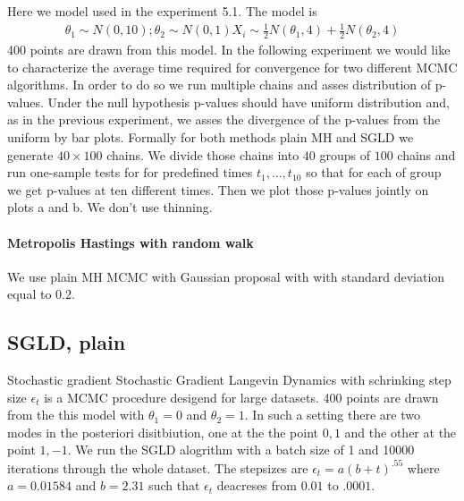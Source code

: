 \documentclass{article}
\begin{document}
Here we model used in the experiment 5.1. The model is 
\begin{align}
 \theta_1 \sim N(0,10) ; \theta_2 \sim N(0,1)
 X_i \sim \frac {1}{2} N(\theta_1,4) + \frac{1}{2} N(\theta_2,4) 
\end{align}
400 points are drawn from this model. In the following experiment we would like to characterize the average time required for convergence for two different MCMC algorithms. In order to do so we run multiple chains and asses distribution of p-values. Under the null hypothesis p-values should have uniform distribution and, as in the previous experiment, we asses the divergence of the p-values from the uniform by bar plots. Formally for both methods plain MH and SGLD we generate $40 \times 100$ chains. We divide those chains into $40$ groups of $100$ chains and run one-sample tests for for predefined times $t_1,...,t_10$  so that for each of group we get p-values at ten different times. Then we plot those p-values jointly on plots a and b. We don't use thinning.  


\paragraph{Metropolis Hastings with random walk}
We use plain MH MCMC with Gaussian proposal with with standard deviation equal to  $0.2$.   

\subsection{SGLD, plain }
Stochastic gradient  Stochastic Gradient Langevin Dynamics  with schrinking step size $\epsilon_t$ is a MCMC procedure desigend for large datasets. 
400 points are drawn from the this model with $\theta_1 = 0$ and $\theta_2= 1$. In such a setting there are two modes in the posteriori disitbiution, one at the the point $0,1$ and the other at the point $1,-1$. We run the SGLD alogrithm with a batch size of 1 and 10000 iterations through the whole dataset. The stepsizes are $\epsilon_t = a(b+t)^{.55}$ where $ a = 0.01584$ and $b=2.31$ such that $\epsilon_t$ deacreses from $0.01$ to $.
0001$. 
\end{document}
